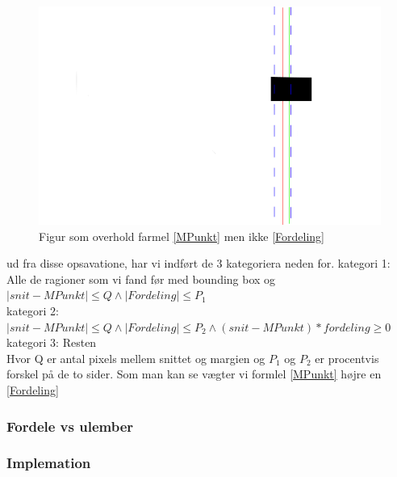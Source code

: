 \begin{figure}[h]
	\begin{center}
		\includegraphics[scale=0.76,angle=0]{afsnit/vores_implementation/billeder/udvidet_loesning/dontwork2.png}
	\end{center}
	\caption[]{Figur som overhold farmel \ref{MPunkt} men ikke \ref{Fordeling}}
	\label{dontwork2}
\end{figure}

ud fra disse opsavatione, har vi indført de 3 kategoriera neden for.
kategori 1: Alle de ragioner som vi fand før med bounding box og $ |snit - MPunkt| \leq Q \wedge |Fordeling| \leq P_1$ \\
kategori 2: $|snit - MPunkt| \leq Q \wedge |Fordeling| \leq P_2 \wedge (snit - MPunkt)*fordeling \geq 0$ \\
kategori 3: Resten\\

Hvor Q er antal pixels mellem snittet og margien og $P_1$ og $P_2$ er procentvis forskel på de to sider.
Som man kan se vægter vi formlel \ref{MPunkt} højre en \ref{Fordeling}

\subsubsection{Fordele vs ulember}

\subsubsection{Implemation}
